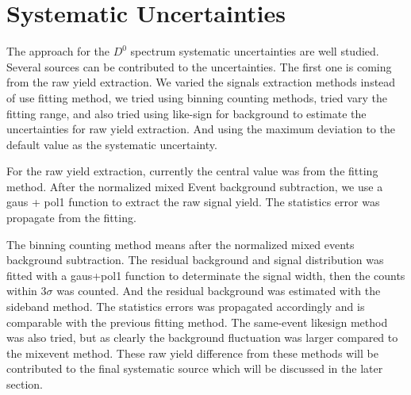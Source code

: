 \clearpage

\section{\label{systematic}Systematic Uncertainties}
%
%

The approach for the $D^0$ spectrum systematic uncertainties are well studied. Several sources can be contributed to the uncertainties. The first one is coming from the raw yield extraction. We varied the signals extraction methods instead of use fitting method, we tried using binning counting methods, tried vary the fitting range, and also tried using like-sign for background to estimate the uncertainties for raw yield extraction. And using the maximum deviation to the default value as the systematic uncertainty.

For the raw yield extraction, currently the central value was from the fitting method. After the normalized mixed Event background subtraction, we use a gaus + pol1 function to extract the raw signal yield. The statistics error was propagate from the fitting. 

The binning counting method means after the normalized mixed events background subtraction. The residual background and signal distribution was fitted with a gaus+pol1 function to determinate the signal width, then the counts within 3$\sigma$ was counted. And the residual background was estimated with the sideband method. The statistics errors was propagated accordingly and is comparable with the previous fitting method. The same-event likesign method was also tried, but as clearly the background fluctuation was larger compared to the mixevent method. These raw yield difference from these methods will be contributed to the final systematic source which will be discussed in the later section.

